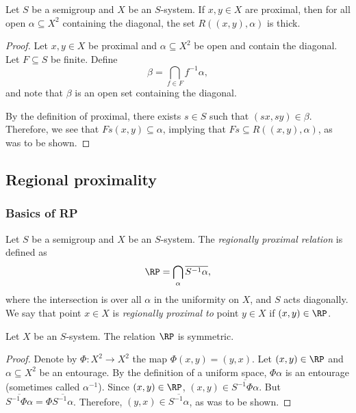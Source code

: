 \begin{theorem}
\label{thm_prox_pair_visits_diag_thickly}
\leanok{}
    Let $S$ be a semigroup and $X$ be an $S$-system.  If $x, y \in X$ are proximal, then for all open $\alpha \subseteq X^2$ containing the diagonal, the set $R((x,y), \alpha)$ is thick.
\end{theorem}

\begin{proof}
\leanok{}
    Let $x, y \in X$ be proximal and $\alpha \subseteq X^2$ be open and contain the diagonal.  Let $F \subseteq S$ be finite. Define
    \[\beta = \bigcap_{f \in F} f^{-1} \alpha,\]
    and note that $\beta$ is an open set containing the diagonal.

    By the definition of proximal, there exists $s \in S$ such that $(sx,sy) \in \beta$.  Therefore, we see that $Fs (x,y) \subseteq \alpha$, implying that $Fs \subseteq R((x,y),\alpha)$, as was to be shown.
\end{proof}

\subsection{Regional proximality}

\subsubsection{Basics of RP}

\begin{definition}
\label{def_rp_relation}
\leanok{}
    Let $S$ be a semigroup and $X$ be an $S$-system.  The \emph{regionally proximal relation} is defined as
    \[\RP = \bigcap_{\alpha} \overline{S^{-1} \alpha},\]
    where the intersection is over all $\alpha$ in the uniformity on $X$, and $S$ acts diagonally.  We say that point $x \in X$ is \emph{regionally proximal to} point $y \in X$ if $(x,y) \in \RP$.
\end{definition}

\begin{lemma}
    \label{lemma_frp_basics_symmetric}
    \leanok{}
    Let $X$ be an $S$-system.  The relation $\RP$ is symmetric.
\end{lemma}

\begin{proof}
\leanok{}
    Denote by $\Phi: X^2 \to X^2$ the map $\Phi(x,y) = (y,x)$. Let $(x,y) \in \RP$ and $\alpha \subseteq X^2$ be an entourage. By the definition of a uniform space, $\Phi \alpha$ is an entourage (sometimes called $\alpha^{-1}$). Since $(x,y) \in \RP$, $(x,y) \in \overline{S^{-1} \Phi \alpha}$. But $\overline{S^{-1} \Phi \alpha} = \Phi \overline{S^{-1} \alpha}$. Therefore, $(y,x) \in \overline{S^{-1} \alpha}$, as was to be shown.
\end{proof}

